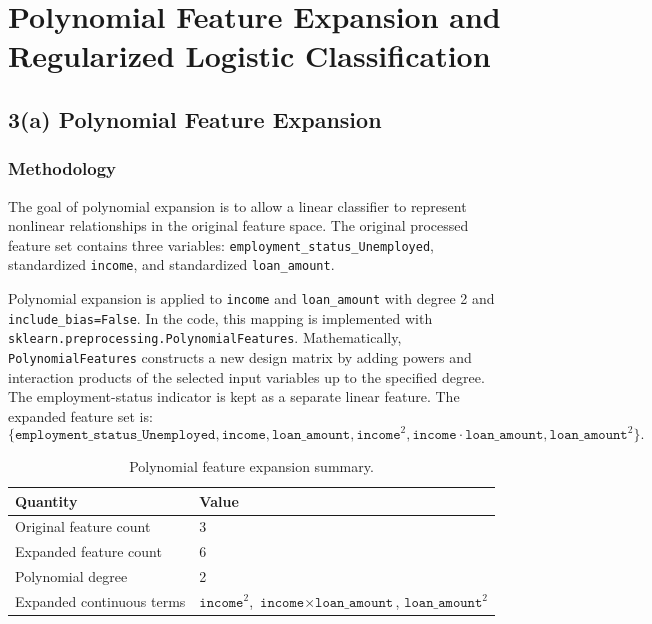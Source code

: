 \documentclass[12pt]{article}
\begin{document}
\section{Polynomial Feature Expansion and Regularized Logistic Classification}

\subsection{3(a) Polynomial Feature Expansion}

\subsubsection{Methodology}

The goal of polynomial expansion is to allow a linear classifier to represent nonlinear relationships in the original feature space. The original processed feature set contains three variables: \texttt{employment\_status\_Unemployed}, standardized \texttt{income}, and standardized \texttt{loan\_amount}.

Polynomial expansion is applied to \texttt{income} and \texttt{loan\_amount} with degree 2 and \texttt{include\_bias=False}. In the code, this mapping is implemented with \texttt{sklearn.preprocessing.PolynomialFeatures}. Mathematically, \texttt{PolynomialFeatures} constructs a new design matrix by adding powers and interaction products of the selected input variables up to the specified degree. The employment-status indicator is kept as a separate linear feature. The expanded feature set is:
\[
    \{
    \texttt{employment\_status\_Unemployed},
    \texttt{income},
    \texttt{loan\_amount},
    \texttt{income}^2,
    \texttt{income}\cdot\texttt{loan\_amount},
    \texttt{loan\_amount}^2
    \}.
\]

\begin{table}[htbp]
\centering
\caption{Polynomial feature expansion summary.}
\begin{tabular}{ll}
\toprule
Quantity & Value \\
\midrule
Original feature count & 3 \\
Expanded feature count & 6 \\
Polynomial degree & 2 \\
Expanded continuous terms & $\texttt{income}^2$, $\texttt{income}\times\texttt{loan\_amount}$, $\texttt{loan\_amount}^2$ \\
\bottomrule
\end{tabular}
\end{table}
\end{document}

